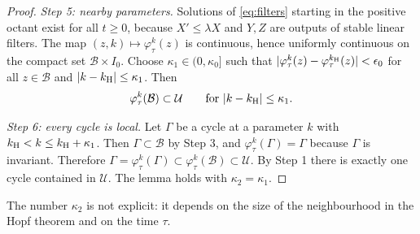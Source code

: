\begin{proof}
\emph{Step 5: nearby parameters.} Solutions of \eqref{eq:filters} starting in the positive octant exist for all $t\ge0$, because $X'\le\lambda X$ and $Y,Z$ are outputs of stable linear filters. The map $(z,k)\mapsto\varphi^k_\tau(z)$ is continuous, hence uniformly continuous on the compact set $\mathcal B\times I_0$. Choose $\kappa_1\in(0,\kappa_0]$ such that $|\varphi^k_\tau(z)-\varphi^{k_{\mathrm H}}_\tau(z)|<\epsilon_0$ for all $z\in\mathcal B$ and $|k-k_{\mathrm H}|\le\kappa_1$. Then
\[
\varphi^k_\tau(\mathcal B)\subset\mathcal U\qquad\text{for }|k-k_{\mathrm H}|\le\kappa_1 .
\]

\emph{Step 6: every cycle is local.} Let $\Gamma$ be a cycle at a parameter $k$ with $k_{\mathrm H}<k\le k_{\mathrm H}+\kappa_1$. Then $\Gamma\subset\mathcal B$ by Step 3, and $\varphi^k_\tau(\Gamma)=\Gamma$ because $\Gamma$ is invariant. Therefore $\Gamma=\varphi^k_\tau(\Gamma)\subset\varphi^k_\tau(\mathcal B)\subset\mathcal U$. By Step 1 there is exactly one cycle contained in $\mathcal U$. The lemma holds with $\kappa_2=\kappa_1$.
\end{proof}
The number $\kappa_2$ is not explicit: it depends on the size of the neighbourhood in the Hopf theorem and on the time $\tau$.

